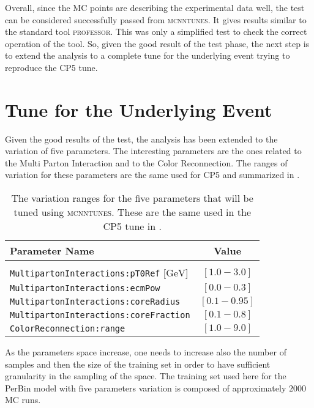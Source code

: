 Overall, since the MC points are describing the experimental data well, the test can be considered successfully passed from \textsc{mcnntunes}. It gives results similar to the standard tool \textsc{professor}. This was only a simplified test to check the correct operation of the tool. So, given  the good result of the test phase, the next step is to extend the analysis to a complete tune for the underlying event trying to reproduce the CP5 tune.



\clearpage
\section{Tune for the Underlying Event}

Given the good results of the test, the analysis has been extended to the variation of five parameters. The interesting  parameters are the ones related to the Multi Parton Interaction and to the Color Reconnection. The ranges of variation for these parameters are the same used for CP5 and summarized in .

\begin{table}[!htb]
\centering
\begin{tabular}{l | c }
Parameter Name & Value \\ 
\hline \hline
\\[-0.85em]
	\texttt{MultipartonInteractions:pT0Ref} [$\mathrm{GeV}$] & $[1.0 - 3.0]$\\[2pt]
	\texttt{MultipartonInteractions:ecmPow} & $[0.0 - 0.3]$\\[2pt]
	\texttt{MultipartonInteractions:coreRadius} & $[0.1 - 0.95 ]$\\[2pt]
	\texttt{MultipartonInteractions:coreFraction} & $[ 0.1 - 0.8 ]$\\[2pt]
	\texttt{ColorReconnection:range} & $[  1.0 - 9.0 ]$
\end{tabular}
\caption{The variation ranges for the five parameters that will be tuned using \textsc{mcnntunes}. These are the same used in the CP5 tune in \cite{CPtunes}.}
\label{table:ranges5params}
\end{table}

\noindent As the parameters space increase, one needs to increase also the number of samples and then the size of the training set in order to have  sufficient granularity in the sampling of the space. 
The training set used here for the PerBin model with five parameters variation is composed of approximately $2000$ MC runs. 

